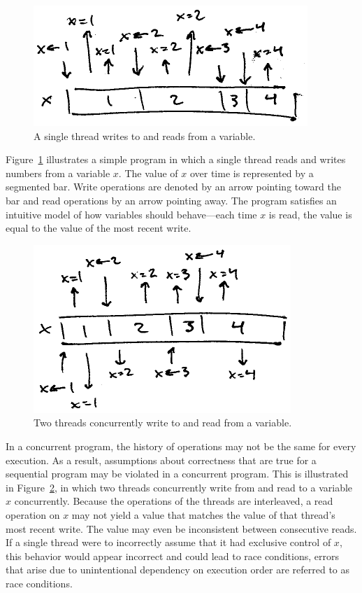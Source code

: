 \documentclass{sig-alternate}
\begin{document}
\begin{figure}[h]
  \centering
  \includegraphics{single-thread-read-write}
  \caption{A single thread writes to and reads from a variable.}
\label{figure:single}
\end{figure}

Figure~\ref{figure:single} illustrates a simple program in which a single thread reads and writes numbers from a variable $x$. The value of $x$ over time is represented by a segmented bar. Write operations are denoted by an arrow pointing toward the bar and read operations by an arrow pointing away. The program satisfies an intuitive model of how variables should behave---each time $x$ is read, the value is equal to the value of the most recent write.

\begin{figure}[h]
  \centering
  \includegraphics{multiple-threads-read-write}
  \caption{Two threads concurrently write to and read from a variable.}
\label{figure:multiple}
\end{figure}

In a concurrent program, the history of operations may not be the same for every execution. As a result, assumptions about correctness that are true for a sequential program may be violated in a concurrent program. This is illustrated in Figure~\ref{figure:multiple}, in which two threads concurrently write from and read to a variable $x$ concurrently. Because the operations of the threads are interleaved, a read operation on $x$ may not yield a value that matches the value of that thread's most recent write. The value may even be inconsistent between consecutive reads. If a single thread were to incorrectly assume that it had exclusive control of $x$, this behavior would appear incorrect and could lead to race conditions, errors that arise due to unintentional dependency on execution order are referred to as race conditions.
\end{document}
